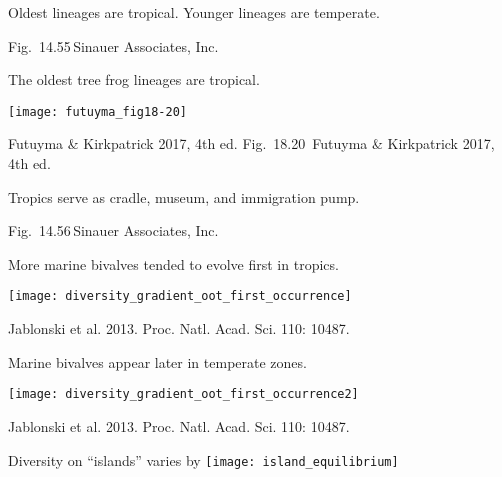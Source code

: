 \documentclass[t]{beamer}
\newcommand{\futuyma}[1]{%
	\ifthenelse{\isempty{#1}}%
	{Futuyma \& Kirkpatrick 2017, 4th ed.}%
	{Fig.~#1~Futuyma \& Kirkpatrick 2017, 4th ed.}%
}
\newcommand{\backskip}{\vspace{-0.5\baselineskip}}
\begin{document}
{
\begin{frame}[t]{Oldest lineages are tropical. Younger lineages are temperate.}


	\vfilll

	\tiny \hfill Fig.~14.55\,\textcopyright Sinauer Associates, Inc.
\end{frame}
}


\begin{frame}{The oldest tree frog lineages are tropical.}


\centering

\texttt{[image: futuyma\_fig18-20]}
	
\tinyfill \futuyma{18.20}

\end{frame}

%
{
\begin{frame}[t]{Tropics serve as cradle, museum, and immigration pump.}


	\vfilll

	\tiny \hfill Fig.~14.56\,\textcopyright Sinauer Associates, Inc.
\end{frame}
}



\begin{frame}[t]{More marine bivalves tended to evolve first in tropics.}
	\begin{center}
		\texttt{[image: diversity\_gradient\_oot\_first\_occurrence]}
	\end{center}
	
	\vfilll
	
	\hfill \tiny Jablonski et al. 2013. Proc. Natl. Acad. Sci. 110: 10487.
\end{frame}
%
\begin{frame}[t]{Marine bivalves appear later in temperate zones.}
	\vspace{-\baselineskip}
	\begin{center}
		\texttt{[image: diversity\_gradient\_oot\_first\_occurrence2]}
	\end{center}
	
	\vfilll
	
	\hfill \tiny Jablonski et al. 2013. Proc. Natl. Acad. Sci. 110: 10487.
\end{frame}
%

\begin{frame}{Diversity on “islands” varies by }
	\centering
		\texttt{[image: island\_equilibrium]}
\end{frame}


\end{document}
